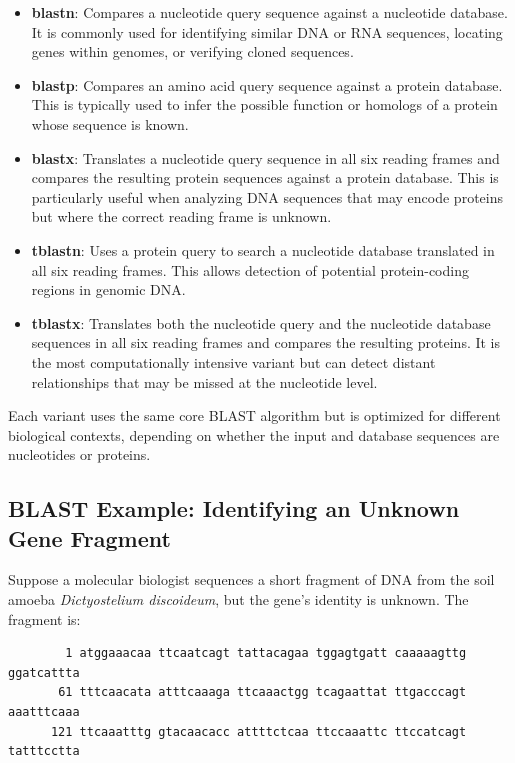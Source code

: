 \begin{itemize}
    \item \textbf{blastn}: Compares a nucleotide query sequence against a nucleotide database. It is commonly used for identifying similar DNA or RNA sequences, locating genes within genomes, or verifying cloned sequences.
    
    \item \textbf{blastp}: Compares an amino acid query sequence against a protein database. This is typically used to infer the possible function or homologs of a protein whose sequence is known.
    
    \item \textbf{blastx}: Translates a nucleotide query sequence in all six reading frames and compares the resulting protein sequences against a protein database. This is particularly useful when analyzing DNA sequences that may encode proteins but where the correct reading frame is unknown.
    
    \item \textbf{tblastn}: Uses a protein query to search a nucleotide database translated in all six reading frames. This allows detection of potential protein-coding regions in genomic DNA.
    
    \item \textbf{tblastx}: Translates both the nucleotide query and the nucleotide database sequences in all six reading frames and compares the resulting proteins. It is the most computationally intensive variant but can detect distant relationships that may be missed at the nucleotide level.
\end{itemize}

Each variant uses the same core BLAST algorithm but is optimized for different biological contexts, depending on whether the input and database sequences are nucleotides or proteins.

\subsection{BLAST Example: Identifying an Unknown Gene Fragment}

Suppose a molecular biologist sequences a short fragment of DNA from the soil amoeba \textit{Dictyostelium discoideum}, but the gene’s identity is unknown. The fragment is:

\begin{verbatim}
        1 atggaaacaa ttcaatcagt tattacagaa tggagtgatt caaaaagttg ggatcattta
       61 tttcaacata atttcaaaga ttcaaactgg tcagaattat ttgacccagt aaatttcaaa
      121 ttcaaatttg gtacaacacc attttctcaa ttccaaattc ttccatcagt tatttcctta
\end{verbatim}

